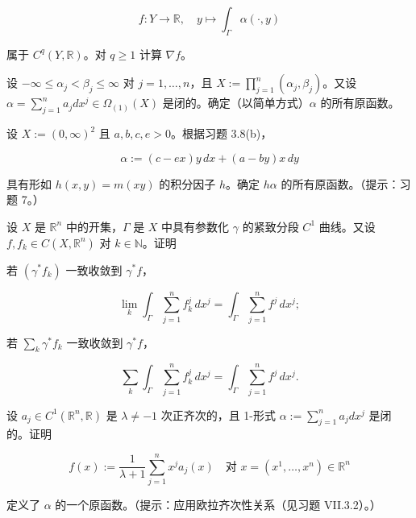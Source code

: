 \begin{exercises}
\[
f : Y \to \mathbb{R} , \quad y \mapsto \int_{\Gamma}\alpha(\cdot,y)
\]

属于 $ C^{q}(Y,\mathbb{R}) $。对 $ q \ge 1 $ 计算 $ \nabla f $。

\item

设 $ -\infty \le \alpha_{j} < \beta_{j} \le \infty $ 对 $ j = 1,\ldots,n $，且 $ X := \prod_{j=1}^{n}(\alpha_{j},\beta_{j}) $。又设 $ \alpha = \sum_{j=1}^{n}a_{j}dx^{j} \in \Omega_{(1)}(X) $ 是闭的。确定（以简单方式）$ \alpha $ 的所有原函数。

\item

设 $ X := (0,\infty)^{2} $ 且 $ a,b,c,e > 0 $。根据习题 3.8(b)，

\[
\alpha := (c - ex)y\,dx + (a - by)x\,dy
\]

具有形如 $ h(x,y) = m(xy) $ 的积分因子 $ h $。确定 $ h\alpha $ 的所有原函数。（提示：习题 7。）

\item

设 $ X $ 是 $ \mathbb{R}^{n} $ 中的开集，$ \Gamma $ 是 $ X $ 中具有参数化 $ \gamma $ 的紧致分段 $ C^{1} $ 曲线。又设 $ f, f_{k} \in C(X,\mathbb{R}^{n}) $ 对 $ k \in \mathbb{N} $。证明

\begin{items}
\item

若 $ (\gamma^{*}f_{k}) $ 一致收敛到 $ \gamma^{*}f $，

\[
\lim_{k}\int_{\Gamma}\sum_{j=1}^{n}f_{k}^{j}\,dx^{j} = \int_{\Gamma}\sum_{j=1}^{n}f^{j}\,dx^{j} ;
\]
\item

若 $ \sum_{k}\gamma^{*}f_{k} $ 一致收敛到 $ \gamma^{*}f $，

\[
\sum_{k}\int_{\Gamma}\sum_{j=1}^{n}f_{k}^{j}\,dx^{j} = \int_{\Gamma}\sum_{j=1}^{n}f^{j}\,dx^{j} .
\]
\end{items}

\item

设 $ a_{j} \in C^{1}(\mathbb{R}^{n},\mathbb{R}) $ 是 $ \lambda \ne -1 $ 次正齐次的，且 1-形式 $ \alpha := \sum_{j=1}^{n}a_{j}dx^{j} $ 是闭的。证明

\[
f(x) := \frac{1}{\lambda + 1}\sum_{j=1}^{n}x^{j}a_{j}(x) \quad \text{对 } x = (x^{1},\ldots,x^{n}) \in \mathbb{R}^{n}
\]

定义了 $ \alpha $ 的一个原函数。（提示：应用欧拉齐次性关系（见习题 VII.3.2）。）


\end{exercises}
